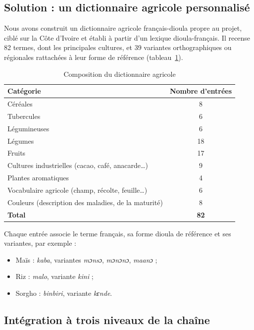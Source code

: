 \documentclass[12pt,a4paper]{article}
\begin{document}
\subsection{Solution : un dictionnaire agricole personnalisé}

Nous avons construit un dictionnaire agricole français-dioula propre au projet, ciblé sur la
Côte d'Ivoire et établi à partir d'un lexique dioula-français. Il recense 82 termes, dont les
principales cultures, et 39 variantes orthographiques ou régionales rattachées à leur forme de
référence (tableau~\ref{tab:dico}).

\begin{table}[h]
\centering
\begin{tabular}{lc}
\toprule
Catégorie & Nombre d'entrées \\
\midrule
Céréales & 8 \\
Tubercules & 6 \\
Légumineuses & 6 \\
Légumes & 18 \\
Fruits & 17 \\
Cultures industrielles (cacao, café, anacarde\dots) & 9 \\
Plantes aromatiques & 4 \\
Vocabulaire agricole (champ, récolte, feuille\dots) & 6 \\
Couleurs (description des maladies, de la maturité) & 8 \\
\midrule
\textbf{Total} & \textbf{82} \\
\bottomrule
\end{tabular}
\caption{Composition du dictionnaire agricole}
\label{tab:dico}
\end{table}

Chaque entrée associe le terme français, sa forme dioula de référence et ses variantes, par exemple :
\begin{itemize}
  \item Maïs : \textit{kaba}, variantes \textit{mɔnsɔ}, \textit{mɔnɔnɔ}, \textit{maanɔ} ;
  \item Riz : \textit{malo}, variante \textit{kini} ;
  \item Sorgho : \textit{binbiri}, variante \textit{kɛnde}.
\end{itemize}

\subsection{Intégration à trois niveaux de la chaîne}
\end{document}
